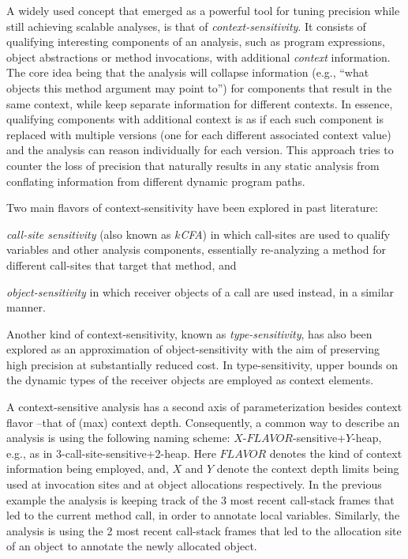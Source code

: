 A widely used concept that emerged as a powerful tool for tuning precision
while still achieving scalable analyses, is that of \emph{context-sensitivity}.
It consists of qualifying interesting components of an analysis, such as
program expressions, object abstractions or method invocations, with additional
\emph{context} information. The core idea being that the analysis will collapse
information (e.g., ``what objects this method argument may point to'') for
components that result in the same context, while keep separate information for
different contexts. In essence, qualifying components with additional context
is as if each such component is replaced with multiple versions (one for each
different associated context value) and the analysis can reason individually
for each version. This approach tries to counter the loss of precision that naturally results in any static analysis from conflating information from different dynamic program paths.

Two main flavors of context-sensitivity have been explored in past literature:
\begin{inparaenum}[(1)]
\item \emph{call-site sensitivity} (also known as \emph{$k$CFA}) \cite{col:1981:Sharir,thesis:Shivers} 
in which call-sites are used to qualify variables and other analysis components, essentially re-analyzing a method for different call-sites that target that method, and
\item \emph{object-sensitivity} \cite{issta:2002:Milanova,article:2005:Milanova,popl:2011:Smaragdakis} in which receiver objects of a call are used
	instead, in a similar manner.
\end{inparaenum}
Another kind of context-sensitivity, known as \emph{type-sensitivity}, has also
been explored as an approximation of object-sensitivity with the aim of
preserving high precision at substantially reduced cost. In type-sensitivity,
upper bounds on the dynamic types of the receiver objects are employed as
context elements. 

A context-sensitive analysis has a second axis of parameterization besides
context flavor --that of (max) context depth. Consequently, a common way to
describe an analysis is using the following naming scheme:
$X$-$FLAVOR$-sensitive+$Y$-heap, e.g., as in 3-call-site-sensitive+2-heap. Here
$FLAVOR$ denotes the kind of context information being employed, and, $X$ and
$Y$ denote the context depth limits being used at invocation sites and at
object allocations respectively. In the previous example the analysis is
keeping track of the 3 most recent call-stack frames that led to the current
method call, in order to annotate local variables. Similarly, the analysis is
using the 2 most recent call-stack frames that led to the allocation site of an
object to annotate the newly allocated object.



